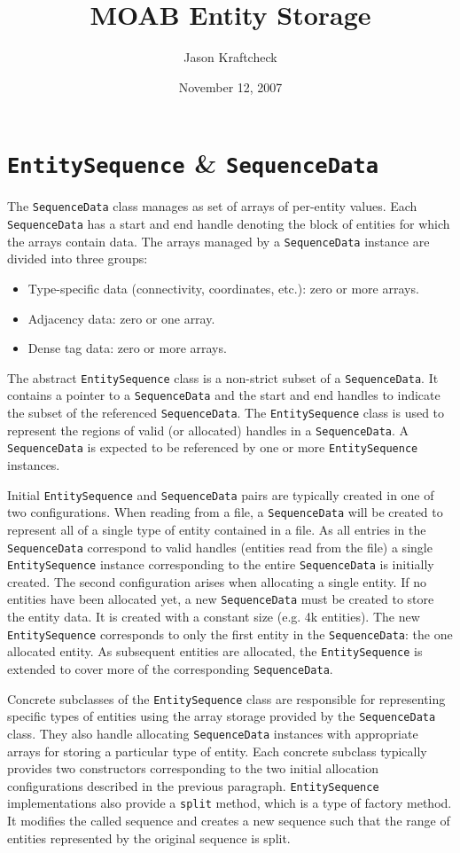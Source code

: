 \documentclass{report}
\title{MOAB Entity Storage}
\author{Jason Kraftcheck}
\date{November 12, 2007}
\begin{document}
\section{\texttt{EntitySequence} \& \texttt{SequenceData}}

The \texttt{SequenceData} class manages as set of arrays of per-entity values.  Each \texttt{SequenceData} has a start and end handle denoting the block of entities for which the arrays contain data.  The arrays managed by a \texttt{SequenceData} instance are divided into three groups:
\begin{itemize}
\item Type-specific data (connectivity, coordinates, etc.): zero or more arrays.
\item Adjacency data: zero or one array.
\item Dense tag data: zero or more arrays.
\end{itemize}

The abstract \texttt{EntitySequence} class is a non-strict subset of a \texttt{SequenceData}.  It contains a pointer to a \texttt{SequenceData}
and the start and end handles to indicate the subset of the referenced \texttt{SequenceData}.  The \texttt{EntitySequence} class is used to represent the regions of valid (or allocated) handles in a \texttt{SequenceData}.  A \texttt{SequenceData} is expected to be referenced by one or more \texttt{EntitySequence} instances.

Initial \texttt{EntitySequence} and \texttt{SequenceData} pairs are typically created in one of two configurations.  When reading from a file, a \texttt{SequenceData} will be created to represent all of a single type of entity contained in a file.  As all entries in the \texttt{SequenceData} correspond to valid handles (entities read from the file) a single \texttt{EntitySequence} instance corresponding to the entire \texttt{SequenceData} is initially created.  The second configuration arises when allocating a single entity.  If no entities have been allocated yet, a new \texttt{SequenceData} must be created to store the entity data.  It is created with a constant size (e.g. 4k entities).  The new \texttt{EntitySequence} corresponds to only the first entity in the \texttt{SequenceData}: the one allocated entity.  As subsequent entities are allocated, the \texttt{EntitySequence} is extended to cover more of the corresponding \texttt{SequenceData}. 

Concrete subclasses of the \texttt{EntitySequence} class are responsible for representing specific types of entities using the array storage provided by the \texttt{SequenceData} class.  They also handle allocating \texttt{SequenceData} instances with appropriate arrays for storing a particular type of entity.  Each concrete subclass typically provides two constructors corresponding to the two initial allocation configurations described in the previous paragraph.  \texttt{EntitySequence} implementations also provide a \texttt{split} method, which is a type of factory method.  It modifies the called sequence and creates a new sequence such that the range of entities represented by the original sequence is split.  
\end{document}
